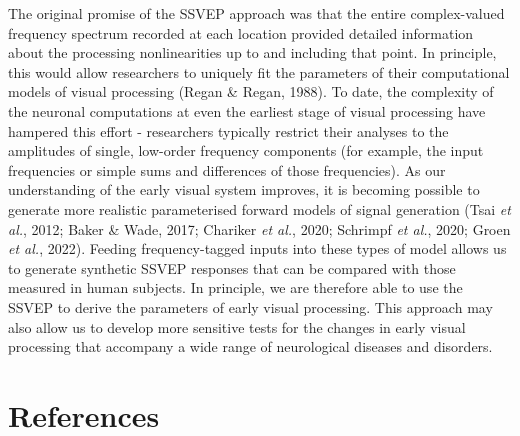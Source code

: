 \documentclass[
  letterpaper,
  DIV=11,
  numbers=noendperiod]{scrartcl}
\begin{document}
The original promise of the SSVEP approach was that the entire
complex-valued frequency spectrum recorded at each location provided
detailed information about the processing nonlinearities up to and
including that point. In principle, this would allow researchers to
uniquely fit the parameters of their computational models of visual
processing (Regan \& Regan, 1988). To date, the complexity of the
neuronal computations at even the earliest stage of visual processing
have hampered this effort - researchers typically restrict their
analyses to the amplitudes of single, low-order frequency components
(for example, the input frequencies or simple sums and differences of
those frequencies). As our understanding of the early visual system
improves, it is becoming possible to generate more realistic
parameterised forward models of signal generation (Tsai \emph{et al.},
2012; Baker \& Wade, 2017; Chariker \emph{et al.}, 2020; Schrimpf
\emph{et al.}, 2020; Groen \emph{et al.}, 2022). Feeding
frequency-tagged inputs into these types of model allows us to generate
synthetic SSVEP responses that can be compared with those measured in
human subjects. In principle, we are therefore able to use the SSVEP to
derive the parameters of early visual processing. This approach may also
allow us to develop more sensitive tests for the changes in early visual
processing that accompany a wide range of neurological diseases and
disorders.

\section*{References}\label{references}
\end{document}
